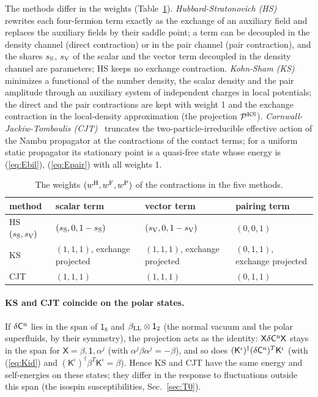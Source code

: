 \documentclass[aps,prd,onecolumn,superscriptaddress,nofootinbib,floatfix,longbibliography]{revtex4-2}
\newcommand{\LL}{{\rm LL}}
\begin{document}
The methods differ in the weights (Table~\ref{tab:weights}).
\emph{Hubbard-Stratonovich (HS)}~\cite{Hubbard1959,Stratonovich1957} rewrites each four-fermion term exactly as the exchange
of an auxiliary field and replaces the auxiliary fields by their saddle point; a term can be decoupled in the density
channel (direct contraction) or in the pair channel (pair contraction), and the shares $s_{\rm S}$, $s_{\rm V}$ of the scalar and
the vector term decoupled in the density channel are parameters; HS keeps no exchange contraction. \emph{Kohn-Sham
(KS)}~\cite{HohenbergKohn1964,KohnSham1965} minimizes a functional of the number density, the scalar density and the pair
amplitude through an auxiliary system of independent charges in local potentials; the direct and the pair contractions are
kept with weight 1 and the exchange contraction in the local-density approximation (the projection $\mathcal P^{\rm KS}$).
\emph{Cornwall-Jackiw-Tomboulis (CJT)}~\cite{CJT1974} truncates the two-particle-irreducible effective action of the Nambu
propagator at the contractions of the contact terms; for a uniform static propagator its stationary point is a quasi-free
state whose energy is (\ref{eq:Ebil}), (\ref{eq:Epair}) with all weights 1.

\begin{table}[h]
\caption{\label{tab:weights}The weights $(w^{\rm H},w^{\rm F},w^{\rm P})$ of the contractions in the five methods.}
\begin{ruledtabular}
\begin{tabular}{llll}
method & scalar term & vector term & pairing term \\
\hline
HS $(s_{\rm S},s_{\rm V})$ & $(s_{\rm S},0,1-s_{\rm S})$ & $(s_{\rm V},0,1-s_{\rm V})$ & $(0,0,1)$ \\
KS & $(1,1,1)$, exchange projected & $(1,1,1)$, exchange projected & $(0,1,1)$, exchange projected \\
CJT & $(1,1,1)$ & $(1,1,1)$ & $(0,1,1)$ \\
\end{tabular}
\end{ruledtabular}
\end{table}

\paragraph*{KS and CJT coincide on the polar states.}
If $\delta\mathsf C^{\rm n}$ lies in the span of $\mathsf 1_8$ and $\beta_\LL\otimes\mathsf 1_2$ (the normal vacuum and the polar superfluids, by
their symmetry), the projection acts as the identity: $\mathsf X\delta\mathsf C^{\rm n}\mathsf X$ stays in the span for $\mathsf X=\beta,\mathsf 1,\alpha^j$
(with $\alpha^j\beta\alpha^j=-\beta$), and so does $(\mathsf K^\iota)^\dagger(\delta\mathsf C^{\rm n})^T\mathsf K^\iota$ (with (\ref{eq:Kid}) and
$(\mathsf K^\iota)^\dagger\beta^T\mathsf K^\iota=\beta$). Hence KS and CJT have the same energy and self-energies on these states; they
differ in the response to fluctuations outside this span (the isospin susceptibilities, Sec.~\ref{sec:T0}).
\end{document}
